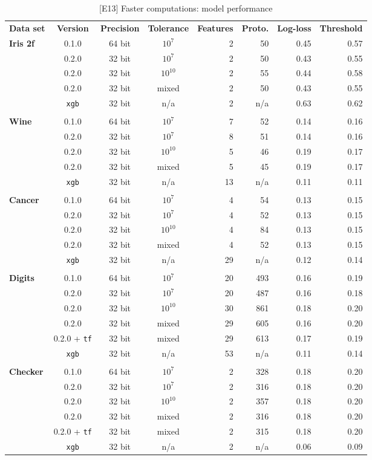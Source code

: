\begin{table}
\caption{[E13] Faster computations: model performance}
\label{tab_faster_performance}
%
\begin{center}
\small
\begin{tabular}{|lcccrrrr|}
\hline
\textbf{Data set}&\textbf{Version}&\textbf{Precision}&\textbf{Tolerance}&\textbf{Features}&\textbf{Proto.}&\textbf{Log-loss}&\textbf{Threshold}\\
\textbf{Iris 2f}&0.1.0&64 bit&$10^7$&2&50&0.45&0.57\\
&0.2.0&32 bit&$10^7$&2&50&0.43&0.55\\
&0.2.0&32 bit&$10^{10}$&2&55&0.44&0.58\\
&0.2.0&32 bit&mixed&2&50&0.43&0.55\\
&\texttt{xgb}&32 bit&n/a&2&n/a&0.63&0.62\\
&&&&&&&\\
\textbf{Wine}&0.1.0&64 bit&$10^7$&7&52&0.14&0.16\\
&0.2.0&32 bit&$10^7$&8&51&0.14&0.16\\
&0.2.0&32 bit&$10^{10}$&5&46&0.19&0.17\\
&0.2.0&32 bit&mixed&5&45&0.19&0.17\\
&\texttt{xgb}&32 bit&n/a&13&n/a&0.11&0.11\\
&&&&&&&\\
\textbf{Cancer}&0.1.0&64 bit&$10^7$&4&54&0.13&0.15\\
&0.2.0&32 bit&$10^7$&4&52&0.13&0.15\\
&0.2.0&32 bit&$10^{10}$&4&84&0.13&0.15\\
&0.2.0&32 bit&mixed&4&52&0.13&0.15\\
&\texttt{xgb}&32 bit&n/a&29&n/a&0.12&0.14\\
&&&&&&&\\
\textbf{Digits}&0.1.0&64 bit&$10^7$&20&493&0.16&0.19\\
&0.2.0&32 bit&$10^7$&20&487&0.16&0.18\\
&0.2.0&32 bit&$10^{10}$&30&861&0.18&0.20\\
&0.2.0&32 bit&mixed&29&605&0.16&0.20\\
&0.2.0 + \texttt{tf}&32 bit&mixed&29&613&0.17&0.19\\
&\texttt{xgb}&32 bit&n/a&53&n/a&0.11&0.14\\
&&&&&&&\\
\textbf{Checker}&0.1.0&64 bit&$10^7$&2&328&0.18&0.20\\
&0.2.0&32 bit&$10^7$&2&316&0.18&0.20\\
&0.2.0&32 bit&$10^{10}$&2&357&0.18&0.20\\
&0.2.0&32 bit&mixed&2&316&0.18&0.20\\
&0.2.0 + \texttt{tf}&32 bit&mixed&2&315&0.18&0.20\\
&\texttt{xgb}&32 bit&n/a&2&n/a&0.06&0.09\\
\hline
\end{tabular}
\end{center}
\end{table}
